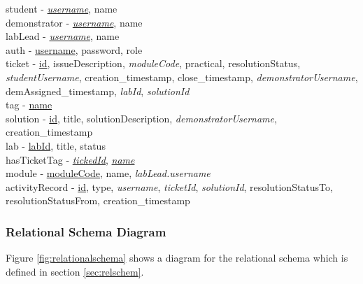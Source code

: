 \noindent student - \underline{\textit{username}}, name \\
demonstrator - \underline{\textit{username}}, name \\
labLead - \underline{\textit{username}}, name \\
auth - \underline{username}, password, role \\
ticket - \underline{id}, issueDescription, \textit{moduleCode}, practical, resolutionStatus, \textit{studentUsername}, creation\_timestamp, close\_timestamp, \textit{demonstratorUsername}, demAssigned\_timestamp, \textit{labId}, \textit{solutionId} \\
tag - \underline{name} \\
solution - \underline{id}, title, solutionDescription, \textit{demonstratorUsername}, creation\_timestamp\\
lab - \underline{labId}, title, status\\
hasTicketTag - \underline{\textit{tickedId}}, \underline{\textit{name}}\\
module - \underline{moduleCode}, name, \textit{labLead.username}\\
activityRecord - \underline{id}, type, \textit{username}, \textit{ticketId}, \textit{solutionId}, resolutionStatusTo, resolutionStatusFrom, creation\_timestamp \\

\subsubsection{Relational Schema Diagram}

Figure \ref{fig:relationalschema} shows a diagram for the relational schema which is defined in section \ref{sec:relschem}.


